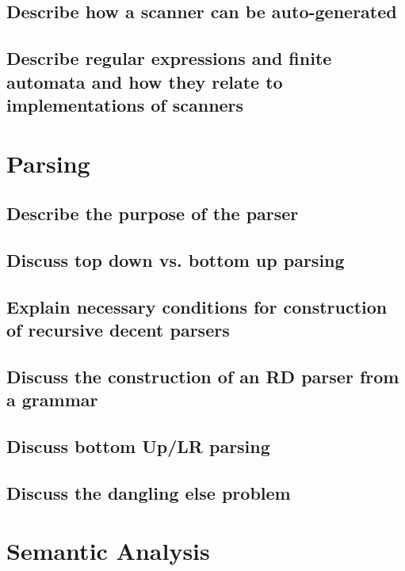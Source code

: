 \documentclass{article}
\begin{document}
\subsection{Describe how a scanner can be auto-generated}

\subsection{Describe regular expressions and finite automata and how they relate to implementations of scanners}

\pagebreak

\section{Parsing}

\subsection{Describe the purpose of the parser}

\subsection{Discuss top down vs. bottom up parsing}

\subsection{Explain necessary conditions for construction of recursive decent parsers}

\subsection{Discuss the construction of an RD parser from a grammar}

\subsection{Discuss bottom Up/LR parsing}

\subsection{Discuss the dangling else problem}

\pagebreak

\section{Semantic Analysis}
\end{document}
